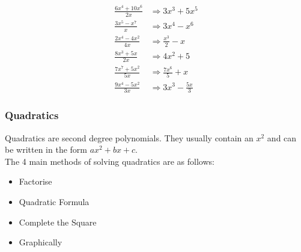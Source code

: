 \documentclass{article}
\begin{document}
\begin{align*}
	\frac{6x^4 + 10x^6}{2x} &\Rightarrow 3x^3 + 5x^5 \\
	\frac{3x^5 - x^7}{x} &\Rightarrow 3x^4 - x^6 \\
	\frac{2x^4 - 4x^2}{4x} &\Rightarrow \frac{x^3}{2}-x \\
	\frac{8x^3 + 5x}{2x} &\Rightarrow 4x^2 + 5 \\
	\frac{7x^7 + 5x^2}{5x} &\Rightarrow \frac{7x^6}{5} + x \\
	\frac{9x^4 - 5x^2}{3x} &\Rightarrow 3x^3 - \frac{5x}{3} 
\end{align*}

\subsubsection{Quadratics}
Quadratics are second degree polynomials. They usually contain an $x^2$ and can be written
in the form $ax^2 + bx + c$.
\\
The 4 main methods of solving quadratics are as follows:
\begin{itemize}
	\item Factorise
	\item Quadratic Formula
	\item Complete the Square
	\item Graphically
\end{itemize}

\break
\end{document}
